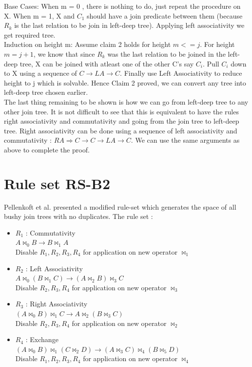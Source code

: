Base Cases: When m = 0 , there is nothing to do, just repeat the procedure on X. When m = 1, X and $C_{1}$ should have a join predicate between them (because $R_{k}$ is the last relation to be join in left-deep tree). Applying left associativity we get required tree.\\

Induction on height m: Assume claim 2 holds for height $m <= j$. For height $m = j+1$, we know that since $R_{k}$ was the last relation to be joined in the left-deep tree, X can be joined with atleast one of the other C's say $C_{i}$. Pull $C_{i}$ down to X using a sequence of $C \rightarrow LA \rightarrow C$. Finally use Left Associativity to reduce height to j which is solvable. Hence Claim 2 proved, we can convert any tree into left-deep tree chosen earlier. \\

The last thing remaining to be shown is how we can go from left-deep tree to any other join tree. It is not difficult to see that this is equivalent to have the rules right associativity and commutativity and going from the join tree to left-deep tree. Right associativity can be done using a sequence of left associativity and commutativity : $RA \Rightarrow C \rightarrow C \rightarrow LA \rightarrow C$. We can use the same arguments as above to complete the proof.

\section{Rule set RS-B2}

Pellenkoft et al. \cite{pellenkoft1997complexity} presented a modified rule-set which generates the space of all bushy join trees with no duplicates. The rule set : 

\begin{itemize}
	\item $R_{1}$ : Commutativity \\ $A \bowtie_{0} B \rightarrow B \bowtie_{1} A$ \\
	Disable 	$R_{1}, R_{2}, R_{3}, R_{4}$ for application on new operator $\bowtie_{1}$
	\item $R_{2}$ : Left Associativity \\ $A \bowtie_{0} (B \bowtie_{1} C) \rightarrow (A \bowtie_{2} B) \bowtie_{3} C$ \\ 
	Disable 	$R_{2}, R_{3}, R_{4}$ for application  on new operator $\bowtie_{3}$	
	\item $R_{3}$ : Right Associativity \\ $(A \bowtie_{0} B) \bowtie_{1} C \rightarrow A \bowtie_{2} (B \bowtie_{3} C)$ \\
	Disable $R_{2}, R_{3}, R_{4}$ for application on new operator $\bowtie_{2}$	
	\item $R_{4}$ : Exchange \\ $(A \bowtie_{0} B) \bowtie_{1} (C \bowtie_{2} D) \rightarrow (A \bowtie_{3} C) \bowtie_{4} (B \bowtie_{5} D)$ \\
	Disable 	$R_{1}, R_{2}, R_{3}, R_{4}$ for application on new operator $\bowtie_{4}$
\end{itemize}

